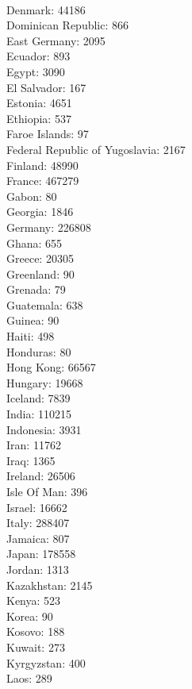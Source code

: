 \begin{multicols}{4}
  \\ Denmark:	44186
  \\ Dominican Republic:	866
  \\ East Germany:	2095
  \\ Ecuador:	893
  \\ Egypt:	3090
  \\ El Salvador:	167
  \\ Estonia:	4651
  \\ Ethiopia:	537
  \\ Faroe Islands:	97
  \\ Federal Republic of Yugoslavia:	2167
  \\ Finland:	48990
  \\ France:	467279
  \\ Gabon:	80
  \\ Georgia:	1846
  \\ Germany:	226808
  \\ Ghana:	655
  \\ Greece:	20305
  \\ Greenland:	90
  \\ Grenada:	79
  \\ Guatemala:	638
  \\ Guinea:	90
  \\ Haiti:	498
  \\ Honduras:	80
  \\ Hong Kong:	66567
  \\ Hungary:	19668
  \\ Iceland:	7839
  \\ India:	110215
  \\ Indonesia:	3931
  \\ Iran:	11762
  \\ Iraq:	1365
  \\ Ireland:	26506
  \\ Isle Of Man:	396
  \\ Israel:	16662
  \\ Italy:	288407
  \\ Jamaica:	807
  \\ Japan:	178558
  \\ Jordan:	1313
  \\ Kazakhstan:	2145
  \\ Kenya:	523
  \\ Korea:	90
  \\ Kosovo:	188
  \\ Kuwait:	273
  \\ Kyrgyzstan:	400
  \\ Laos:	289

\end{multicols}

